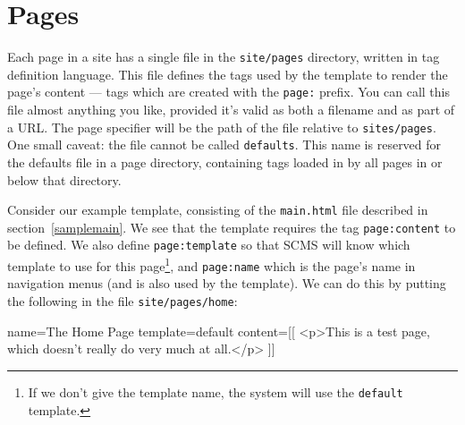 
%
%
%
%
%
%
% 
%
% 
% 
%

\chapter{Pages}
\label{chappages}
Each page in a site has a single file in the \texttt{site/pages} directory,
written in tag definition language. This file defines the tags used by the
template to render the page's content --- tags which are created with the
\texttt{page:} prefix. You can call this file almost anything you like, provided it's
valid as both a filename and as part of a URL. The page specifier will be the
path of the file relative to \texttt{sites/pages}. One small caveat: the file
cannot be called \texttt{defaults}. This name is reserved for the defaults
file in a page directory, containing tags loaded in by all pages in or below that
directory.

Consider our example template, consisting of the \texttt{main.html} file
described in section~\ref{samplemain}. We see that
the template requires the tag \texttt{page:content} to be defined. We
also define \texttt{page:template} so that SCMS will know which template to
use for this page\footnote{If we don't give the template name, the system will use the \texttt{default} template.}, and \texttt{page:name} which is the page's name in
navigation menus (and is also used by the template). We can do this by putting
the following in the file \texttt{site/pages/home}:

\begin{MyVerbatim}
 name=The Home Page
 template=default
 content=[[
   <p>This is a test page, which doesn't really do very
   much at all.</p>
 ]]
\end{MyVerbatim}

